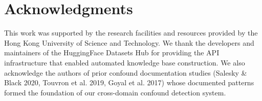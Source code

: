 \section*{Acknowledgments}

This work was supported by the research facilities and resources provided by the Hong Kong University of Science and Technology. We thank the developers and maintainers of the HuggingFace Datasets Hub for providing the API infrastructure that enabled automated knowledge base construction. We also acknowledge the authors of prior confound documentation studies (Salesky \& Black 2020, Touvron et al. 2019, Goyal et al. 2017) whose documented patterns formed the foundation of our cross-domain confound detection system.
